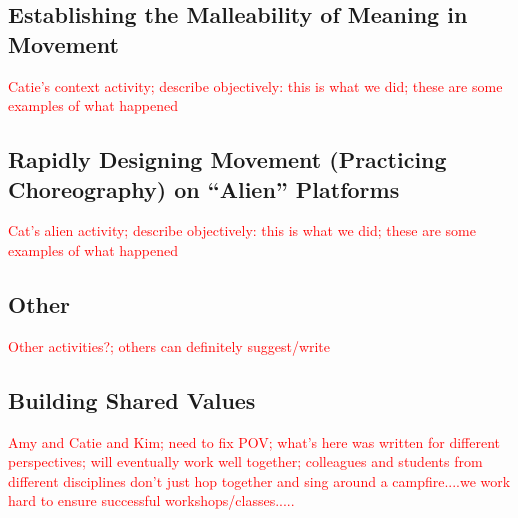 \documentclass[arts,article,submit,moreauthors,pdftex,10pt,a4paper]{mdpi}
\begin{document}

\subsection{Establishing the Malleability of Meaning in Movement}

\textcolor{red}{Catie's context activity; describe objectively: this is what we did; these are some examples of what happened}

\subsection{Rapidly Designing Movement (Practicing Choreography) on ``Alien'' Platforms}

\textcolor{red}{Cat's alien activity; describe objectively: this is what we did; these are some examples of what happened}

\subsection{Other}

\textcolor{red}{Other activities?; others can definitely suggest/write}

\subsection{Building Shared Values} %

\textcolor{red}{Amy and Catie and Kim; need to fix POV; what's here was written for different perspectives; will eventually work well together; colleagues and students from different disciplines don't just hop together and sing around a campfire....we work hard to ensure successful workshops/classes.....}
\end{document}

